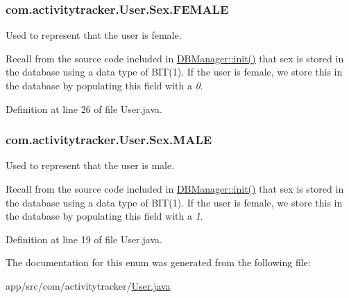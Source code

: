 \subsubsection[{\texorpdfstring{F\+E\+M\+A\+LE}{FEMALE}}]{\setlength{\rightskip}{0pt plus 5cm}com.\+activitytracker.\+User.\+Sex.\+F\+E\+M\+A\+LE}\hypertarget{enumcom_1_1activitytracker_1_1_user_1_1_sex_a5c22ece8a4df71ed5202cd492990a752}{}\label{enumcom_1_1activitytracker_1_1_user_1_1_sex_a5c22ece8a4df71ed5202cd492990a752}
Used to represent that the user is female.

Recall from the source code included in \hyperlink{classcom_1_1activitytracker_1_1_d_b_manager_a41df4600bb5901a26a4ea6a7108a70b9}{D\+B\+Manager\+::init()} that sex is stored in the database using a data type of B\+I\+T(1). If the user is female, we store this in the database by populating this field with a {\itshape 0}. 

Definition at line 26 of file User.\+java.

\subsubsection[{\texorpdfstring{M\+A\+LE}{MALE}}]{\setlength{\rightskip}{0pt plus 5cm}com.\+activitytracker.\+User.\+Sex.\+M\+A\+LE}\hypertarget{enumcom_1_1activitytracker_1_1_user_1_1_sex_ad3b626a38bd4615eb621d75b939f412d}{}\label{enumcom_1_1activitytracker_1_1_user_1_1_sex_ad3b626a38bd4615eb621d75b939f412d}
Used to represent that the user is male.

Recall from the source code included in \hyperlink{classcom_1_1activitytracker_1_1_d_b_manager_a41df4600bb5901a26a4ea6a7108a70b9}{D\+B\+Manager\+::init()} that sex is stored in the database using a data type of B\+I\+T(1). If the user is female, we store this in the database by populating this field with a {\itshape 1}. 

Definition at line 19 of file User.\+java.



The documentation for this enum was generated from the following file\+:\begin{DoxyCompactItemize}
\item 
app/src/com/activitytracker/\hyperlink{_user_8java}{User.\+java}\end{DoxyCompactItemize}

